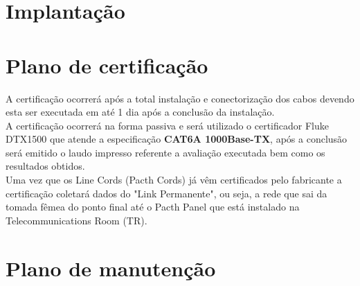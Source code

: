 \documentclass[	DIV=calc,%
							paper=a4,%
							fontsize=12pt,%
							onecolumn]{scrartcl}	 					%
\begin{document}



\section{Implantação}




\section{Plano de certificação}

A certificação ocorrerá após a total instalação e conectorização dos cabos devendo esta ser executada em até 1 dia após a conclusão da instalação.\\
A certificação ocorrerá na forma passiva e será utilizado o certificador Fluke DTX1500 que atende a especificação \textbf{CAT6A 1000Base-TX}, após a conclusão será emitido o laudo impresso referente a avaliação executada bem como os resultados obtidos.\\
Uma vez que os Line Cords (Pacth Cords) já vêm certificados pelo fabricante a certificação coletará dados do "Link Permanente", ou seja, a rede que sai da tomada fêmea do ponto final até o Pacth Panel que está instalado na Telecommunications Room (TR). 
\section{Plano de manutenção}
\end{document}

